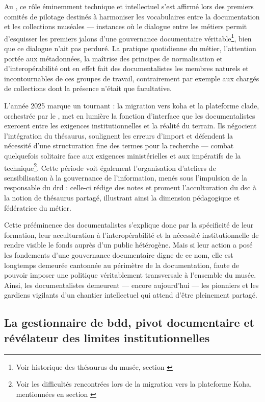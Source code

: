 Au \mae, ce rôle éminemment technique et intellectuel s’est affirmé lors des premiers comités de pilotage destinés à harmoniser les vocabulaires entre la documentation et les collections muséales — instances où le dialogue entre les métiers permit d’esquisser les premiers jalons d’une gouvernance documentaire véritable\footnote{Voir historique des thésaurus du musée, section \textit{\hyperref[II-A-1]{}}}, bien que ce dialogue n'ait pas perduré. La pratique quotidienne du métier, l’attention portée aux métadonnées, la maîtrise des principes de normalisation et d’interopérabilité ont en effet fait des documentalistes les membres naturels et incontournables de ces groupes de travail, contrairement par exemple aux chargés de collections dont la présence n'était que facultative.

L’année 2025 marque un tournant : la migration vers \gls{koha} et la plateforme \gls{clade}, orchestrée par le \minarm, met en lumière la fonction d’interface que les documentalistes exercent entre les exigences institutionnelles et la réalité du terrain. Ils négocient l’intégration du thésaurus, soulignent les erreurs d’import et défendent la nécessité d’une structuration fine des termes pour la recherche — combat quelquefois solitaire face aux exigences ministérielles et aux impératifs de la technique\footnote{Voir les difficultés rencontrées lors de la migration vers la plateforme Koha, mentionnées en section \textit{\hyperref[I-B-2]{}}}. Cette période voit également l’organisation d’ateliers de sensibilisation à la gouvernance de l'information, menés sous l’impulsion de la responsable du \ac{drd} : celle-ci rédige des notes et promeut l’acculturation du \ac{dsc} à la notion de thésaurus partagé, illustrant ainsi la dimension pédagogique et fédératrice du métier.

Cette prééminence des documentalistes s’explique donc par la spécificité de leur formation, leur acculturation à l’interopérabilité et la nécessité institutionnelle de rendre visible le fonds auprès d’un public hétérogène. Mais si leur action a posé les fondements d’une gouvernance documentaire digne de ce nom, elle est longtemps demeurée cantonnée au périmètre de la documentation, faute de pouvoir imposer une politique véritablement transversale à l’ensemble du musée. Ainsi, les documentalistes demeurent — encore aujourd’hui — les pionniers et les gardiens vigilants d’un chantier intellectuel qui attend d’être pleinement partagé.

\subsection{La gestionnaire de \ac{bdd}, pivot documentaire et révélateur des limites institutionnelles}

